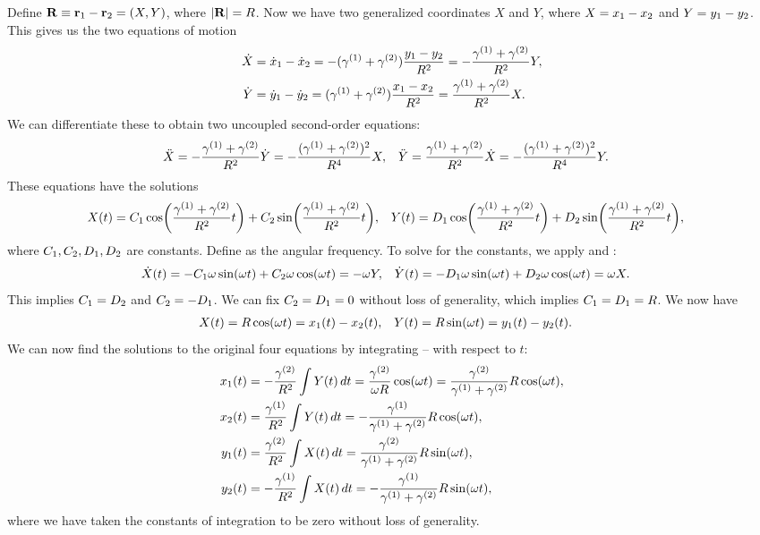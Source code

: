 \begin{solution}
	Define $\mathbf{R} \equiv \mathbf{r}_1 - \mathbf{r}_2 = (X, Y)$, where $|\mathbf{R}| = R$.  Now we have two generalized coordinates $X$ and $Y$, where $X = x_1 - x_2$ and $Y = y_1 - y_2$.  This gives us the two equations of motion
	\begin{align}
		\dot{X} &= \dot{x}_1 - \dot{x}_2
		= -(\gamma^{(1)} + \gamma^{(2)}) \frac{y_1 - y_2}{R^2}
		= -\frac{\gamma^{(1)} + \gamma^{(2)}}{R^2} Y, \label{eqnX} \\
		\dot{Y} &= \dot{y}_1 - \dot{y}_2
		= (\gamma^{(1)} + \gamma^{(2)}) \frac{x_1 - x_2}{R^2}
		= \frac{\gamma^{(1)} + \gamma^{(2)}}{R^2} X. \label{eqnY}
	\end{align}
	We can differentiate these to obtain two uncoupled second-order equations:
	\begin{align*}
		\ddot{X} &= -\frac{\gamma^{(1)} + \gamma^{(2)}}{R^2} \dot{Y}
		= -\frac{(\gamma^{(1)} + \gamma^{(2)})^2}{R^4} X, &
		\ddot{Y} &= \frac{\gamma^{(1)} + \gamma^{(2)}}{R^2} \dot{X}
		= -\frac{(\gamma^{(1)} + \gamma^{(2)})^2}{R^4} Y.
	\end{align*}
	These equations have the solutions
	\begin{align*}
		X(t) &= C_1 \cos(\frac{\gamma^{(1)} + \gamma^{(2)}}{R^2} t) + C_2 \sin(\frac{\gamma^{(1)} + \gamma^{(2)}}{R^2} t), &
		Y(t) &= D_1 \cos(\frac{\gamma^{(1)} + \gamma^{(2)}}{R^2} t) + D_2 \sin(\frac{\gamma^{(1)} + \gamma^{(2)}}{R^2} t),
	\end{align*}
	where $C_1, C_2, D_1, D_2$ are constants.  Define
	\beqn \label{omg}
		\omg \equiv {}
	\eeqn
	as the angular frequency.  To solve for the constants, we apply  and :
	\begin{align*}
		\dot{X}(t) &= -C_1 \omega \sin(\omega t) + C_2 \omega \cos(\omega t) = -\omega Y, &
		\dot{Y}(t) &= -D_1 \omega \sin(\omega t) + D_2 \omega \cos(\omega t) = \omega X.
	\end{align*}
	This implies $C_1 = D_2$ and $C_2 = -D_1$.  We can fix $C_2 = D_1 = 0$ without loss of generality, which implies $C_1 = D_1 = R$.  We now have
	\begin{align} \label{2eqns}
		X(t) &= R \cos(\omega t) = x_1(t) - x_2(t), &
		Y(t) &= R \sin(\omega t) = y_1(t) - y_2(t).
	\end{align}
	We can now find the solutions to the original four equations by integrating -- with respect to $t$:
	\begin{align*}
		x_1(t) &= -\frac{\gamma^{(2)}}{R^2} \int Y(t) \dd{t}
		= \frac{\gamma^{(2)}}{\omega R} \cos(\omega t)
		= \frac{\gamma^{(2)}}{\gamma^{(1)} + \gamma^{(2)}} R \cos(\omega t), \\
		x_2(t) &= \frac{\gamma^{(1)}}{R^2} \int Y(t) \dd{t}
		= -\frac{\gamma^{(1)}}{\gamma^{(1)} + \gamma^{(2)}} R \cos(\omega t), \\
		y_1(t) &= \frac{\gamma^{(2)}}{R^2} \int X(t) \dd{t}
		= \frac{\gamma^{(2)}}{\gamma^{(1)} + \gamma^{(2)}} R \sin(\omega t), \\
		y_2(t) &= -\frac{\gamma^{(1)}}{R^2} \int X(t) \dd{t}
		= -\frac{\gamma^{(1)}}{\gamma^{(1)} + \gamma^{(2)}} R \sin(\omega t),
	\end{align*}
	where we have taken the constants of integration to be zero without loss of generality.


\end{solution}
